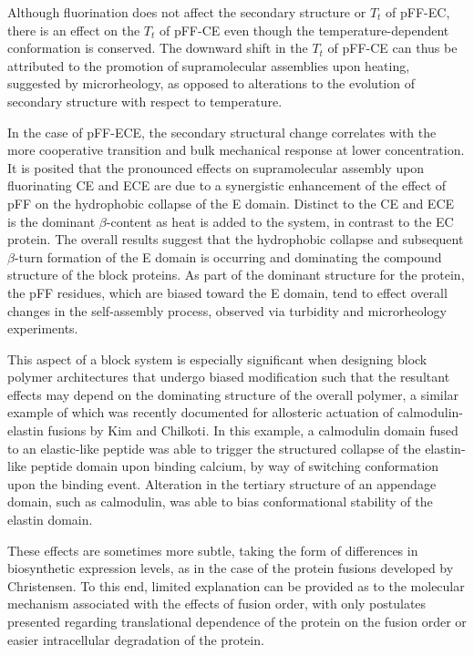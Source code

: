 \begin{refsection}
Although fluorination does not affect the secondary structure or ${T_t}$ of
pFF-EC, there is an effect on the ${T_t}$ of pFF-CE even though the
temperature-dependent conformation is conserved. The downward shift in the
${T_t}$ of pFF-CE can thus be attributed to the promotion of supramolecular
assemblies upon heating, suggested by microrheology, as opposed to alterations
to the evolution of secondary structure with respect to temperature.

In the case of pFF-ECE, the secondary structural change correlates with the more
cooperative transition and bulk mechanical response at lower concentration. It
is posited that the pronounced effects on supramolecular assembly upon
fluorinating CE and ECE are due to a synergistic enhancement of the effect of
pFF on the hydrophobic collapse of the E domain. Distinct to the CE and ECE is
the dominant ${\beta}$-content as heat is added to the system, in contrast to
the EC protein. The overall results suggest that the hydrophobic collapse and
subsequent ${\beta}$-turn formation of the E domain is occurring and dominating
the compound structure of the block proteins. As part of the dominant structure
for the protein, the pFF residues, which are biased toward the E domain, tend to
effect overall changes in the self-assembly process, observed via turbidity and
microrheology experiments.

This aspect of a block system is especially significant when designing block
polymer architectures that undergo biased modification such that the resultant
effects may depend on the dominating structure of the overall polymer, a similar
example of which was recently documented for allosteric actuation of
calmodulin-elastin fusions by Kim and Chilkoti.\cite{Kim2008a} In this example,
a calmodulin domain fused to an elastic-like peptide was able to trigger the
structured collapse of the elastin-like peptide domain upon binding calcium, by
way of switching conformation upon the binding event. Alteration in the tertiary
structure of an appendage domain, such as calmodulin, was able to bias
conformational stability of the elastin domain.

These effects are sometimes more subtle, taking the form of differences in
biosynthetic expression levels, as in the case of the protein fusions developed
by Christensen.\cite{Christensen2009} To this end, limited explanation can be
provided as to the molecular mechanism associated with the effects of fusion
order, with only postulates presented regarding translational dependence of the
protein on the fusion order or easier intracellular degradation of the protein.


\end{refsection}
